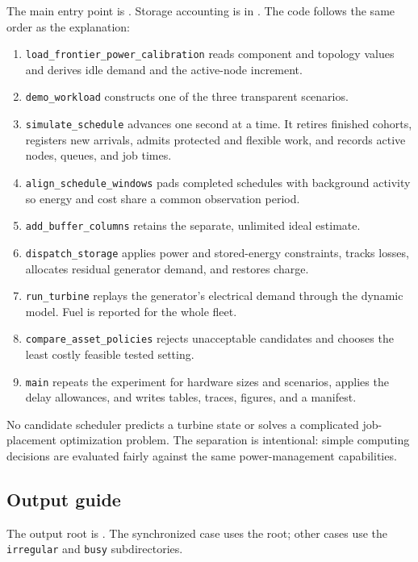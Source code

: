 \documentclass[11pt]{article}
\begin{document}
The main entry point is
.
Storage accounting is in
.
The code follows the same order as the explanation:
\begin{enumerate}
\item \texttt{load\_frontier\_power\_calibration} reads component and topology
values and derives idle demand and the active-node increment.
\item \texttt{demo\_workload} constructs one of the three transparent scenarios.
\item \texttt{simulate\_schedule} advances one second at a time. It retires
finished cohorts, registers new arrivals, admits protected and flexible work,
and records active nodes, queues, and job times.
\item \texttt{align\_schedule\_windows} pads completed schedules with background
activity so energy and cost share a common observation period.
\item \texttt{add\_buffer\_columns} retains the separate, unlimited ideal estimate.
\item \texttt{dispatch\_storage} applies power and stored-energy constraints,
tracks losses, allocates residual generator demand, and restores charge.
\item \texttt{run\_turbine} replays the generator's electrical demand through
the dynamic model. Fuel is reported for the whole fleet.
\item \texttt{compare\_asset\_policies} rejects unacceptable candidates and
chooses the least costly feasible tested setting.
\item \texttt{main} repeats the experiment for hardware sizes and scenarios,
applies the delay allowances, and writes tables, traces, figures, and a manifest.
\end{enumerate}

No candidate scheduler predicts a turbine state or solves a complicated
job-placement optimization problem. The separation is intentional:
simple computing decisions are evaluated fairly against the same
power-management capabilities.

\subsection{Output guide}

The output root is
.
The synchronized case uses the root; other cases use the
\texttt{irregular} and \texttt{busy} subdirectories.
\end{document}

